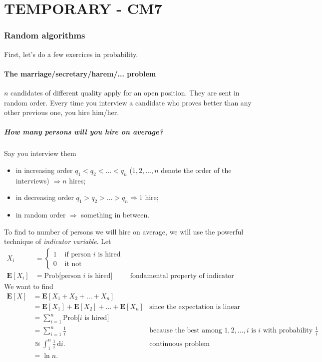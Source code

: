 \part*{TEMPORARY - CM7}

\section{Random algorithms}

First, let's do a few exercices in probability.



\subsection{The marriage/secretary/harem/... problem}
$n$ candidates of different quality apply for an open position. They are sent in random order. Every time you interview a candidate who proves better than any other previous one, you hire him/her.

\subsubsection{How many persons will you hire on average?}
Say you interview them 
\begin{itemize}
\item in increasing order $q_1 < q_2 < \ldots < q_n$ ($1,2, \ldots, n$ denote the order of the interviews) $\Rightarrow n$ hires;
\item in decreasing order $q_1 > q_2 > \ldots > q_n \Rightarrow 1$ hire;
\item in random order $\Rightarrow$ something in between.
\end{itemize}
To find to number of persons we will hire on average, we will use the powerful technique of \textit{indicator variable}. Let
\begin{align*}
X_i &=
  \left\{
      \begin{aligned}
      	1 &\text{ if person $i$ is hired} \\
        0 &\text{ it not }
      \end{aligned}
    \right.\\
\mathbf{E}[X_i] &= \text{Prob[person $i$ is hired}] &\text{ fondamental property of indicator variable}
\end{align*}
We want to find
\begin{align*}
\mathbf{E}[X] &=  \mathbf{E}[X_1+X_2+\ldots+X_n] & \\
&=  \mathbf{E}[X_1] + \mathbf{E}[X_2] + \ldots +\mathbf{E}[X_n]  &\text{since the expectation is linear}\\
&= \sum_{i=1}^n \text{Prob[$i$ is hired]} &\\
&= \sum_{i=1}^n \frac{1}{i} &\text{because the best among $1,2,\ldots,i$ is $i$ with probability $\frac{1}{i}$}\\
&\approxeq \int_1^n \frac{1}{i}  \, \mathrm{d}i. &\text{continuous problem}\\
&= \ln n. &
\end{align*}

